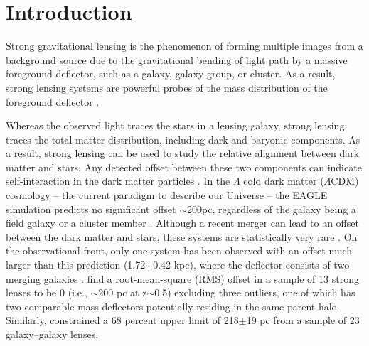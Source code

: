 \documentclass{aa}
\begin{document}

   \maketitle
%

\section{Introduction}

Strong gravitational lensing is the phenomenon of forming multiple images from a background source due to the gravitational bending of light path by a massive foreground deflector, such as a galaxy, galaxy group, or cluster. As a result, strong lensing systems are powerful probes of the mass distribution of the foreground deflector \citep[see][for a review on strong lensing by galaxies]{Shajib22}.

Whereas the observed light traces the stars in a lensing galaxy, strong lensing traces the total matter distribution, including dark and baryonic components. As a result, strong lensing can be used to study the relative alignment between dark matter and stars. Any detected offset between these two components can indicate self-interaction in the dark matter particles \citep{Harvey14, Kahlhoefer14, Robertson17}. In the $\Lambda$ cold dark matter ($\Lambda$CDM) cosmology -- the current paradigm to describe our Universe -- the EAGLE simulation predicts no significant offset $\sim$200pc, regardless of the galaxy being a field galaxy or a cluster member \citep{Schaller15}. Although a recent merger can lead to an offset between the dark matter and stars, these systems are statistically very rare \citep{Schaller15}. On the observational front, only one system has been observed with an offset much larger than this prediction (1.72$\pm$0.42 kpc), where the deflector consists of two merging galaxies  \citep[][]{Shu16}. %
\citet{Shajib19} find a root-mean-square (RMS) offset in a sample of 13 strong lenses to be 0 (i.e., $\sim$200 pc at z$\sim$0.5) excluding three outliers, one of which has two comparable-mass deflectors potentially residing in the same parent halo. Similarly, \citet{Shajib21} constrained a 68 percent upper limit of 218$\pm$19 pc from a sample of 23 galaxy--galaxy lenses.
\end{document}
